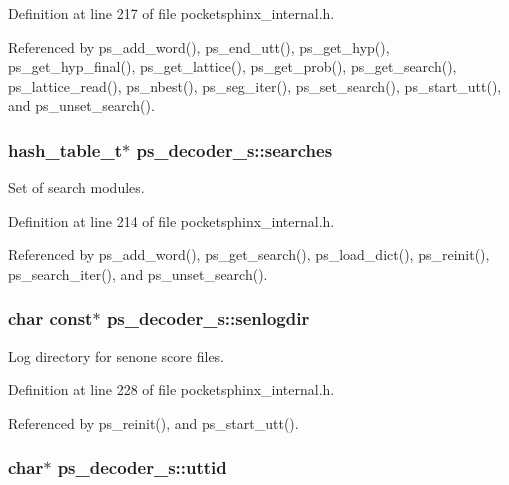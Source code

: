 Definition at line 217 of file pocketsphinx\-\_\-internal.\-h.



Referenced by ps\-\_\-add\-\_\-word(), ps\-\_\-end\-\_\-utt(), ps\-\_\-get\-\_\-hyp(), ps\-\_\-get\-\_\-hyp\-\_\-final(), ps\-\_\-get\-\_\-lattice(), ps\-\_\-get\-\_\-prob(), ps\-\_\-get\-\_\-search(), ps\-\_\-lattice\-\_\-read(), ps\-\_\-nbest(), ps\-\_\-seg\-\_\-iter(), ps\-\_\-set\-\_\-search(), ps\-\_\-start\-\_\-utt(), and ps\-\_\-unset\-\_\-search().

\subsubsection[{searches}]{\setlength{\rightskip}{0pt plus 5cm}hash\-\_\-table\-\_\-t$\ast$ ps\-\_\-decoder\-\_\-s\-::searches}\label{structps__decoder__s_a43bca42790684eefb8d01a0aef6fa530}


Set of search modules. 



Definition at line 214 of file pocketsphinx\-\_\-internal.\-h.



Referenced by ps\-\_\-add\-\_\-word(), ps\-\_\-get\-\_\-search(), ps\-\_\-load\-\_\-dict(), ps\-\_\-reinit(), ps\-\_\-search\-\_\-iter(), and ps\-\_\-unset\-\_\-search().

\subsubsection[{senlogdir}]{\setlength{\rightskip}{0pt plus 5cm}char const$\ast$ ps\-\_\-decoder\-\_\-s\-::senlogdir}\label{structps__decoder__s_a0ed3476113fe3d63b13ac5e8da3f3b4f}


Log directory for senone score files. 



Definition at line 228 of file pocketsphinx\-\_\-internal.\-h.



Referenced by ps\-\_\-reinit(), and ps\-\_\-start\-\_\-utt().

\subsubsection[{uttid}]{\setlength{\rightskip}{0pt plus 5cm}char$\ast$ ps\-\_\-decoder\-\_\-s\-::uttid}\label{structps__decoder__s_a0c21a99a0cb1e71cf7811f99cc17c105}


